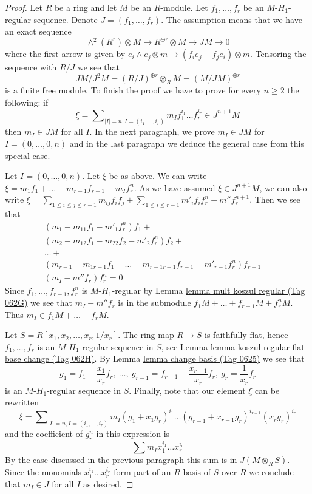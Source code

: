 \documentclass{amsart}
\theoremstyle{plain}
\theoremstyle{definition}
\theoremstyle{remark}
\numberwithin{equation}{subsection}
\begin{document}
\begin{proof}
Let $R$ be a ring and let $M$ be an $R$-module.
Let $f_1, \ldots, f_r$ be an $M$-$H_1$-regular sequence.
Denote $J = (f_1, \ldots, f_r)$. The assumption means that we have
an exact sequence
$$
\wedge^2(R^r) \otimes M \to R^{\oplus r} \otimes M \to JM \to 0
$$
where the first arrow is given by
$e_i \wedge e_j \otimes m \mapsto (f_ie_j - f_je_i) \otimes m$.
Tensoring the sequence with $R/J$ we see that
$$
JM/J^2M = (R/J)^{\oplus r} \otimes_R M = (M/JM)^{\oplus r}
$$
is a finite free module. To finish the proof we have to prove
for every $n \geq 2$ the following: if
$$
\xi = \sum\nolimits_{|I| = n, I = (i_1, \ldots, i_r)}
m_I f_1^{i_1} \ldots f_r^{i_r} \in J^{n + 1}M
$$
then $m_I \in JM$ for all $I$. In the next paragraph, we prove
$m_I \in JM$ for $I = (0, \ldots, 0, n)$ and in the last paragraph
we deduce the general case from this special case.

\medskip\noindent
Let $I = (0, \ldots, 0, n)$. Let $\xi$ be as above. We can write
$\xi = m_1 f_1 + \ldots + m_{r - 1}f_{r - 1} + m_I f_r^n$.
As we have assumed $\xi \in J^{n + 1}M$, we can also write
$\xi = \sum_{1 \leq i \leq j \leq r - 1} m_{ij}f_if_j +
\sum_{1 \leq i \leq r - 1}m'_i f_if_r^n + m'' f_r^{n + 1}$.
Then we see that
$$
\begin{matrix}
(m_1 - m_{11}f_1 - m'_1f_r^n)f_1 + \\
(m_2 - m_{12}f_1 - m_{22}f_2 - m'_2f_r^n)f_2 + \\
\ldots + \\
(m_{r - 1} - m_{1 r - 1}f_1 - \ldots - m_{r - 1 r - 1}f_{r - 1}
- m'_{r - 1}f_r^n)f_{r - 1} + \\
(m_I - m'' f_r)f_r^n = 0
\end{matrix}
$$
Since $f_1, \ldots, f_{r - 1}, f_r^n$ is $M$-$H_1$-regular by
Lemma \href{https://stacks.math.columbia.edu/tag/062G}{lemma mult koszul regular (Tag 062G)} we see that $m_I - m'' f_r$
is in the submodule $f_1M + \ldots + f_{r - 1}M + f_r^nM$.
Thus $m_I \in f_1M + \ldots + f_rM$.

\medskip\noindent
Let $S = R[x_1, x_2, \ldots, x_r, 1/x_r]$. The ring map $R \to S$ is faithfully
flat, hence $f_1, \ldots, f_r$ is an $M$-$H_1$-regular sequence in $S$, see
Lemma \href{https://stacks.math.columbia.edu/tag/062H}{lemma koszul regular flat base change (Tag 062H)}.
By
Lemma \href{https://stacks.math.columbia.edu/tag/0625}{lemma change basis (Tag 0625)}
we see that
$$
g_1 = f_1 - \frac{x_1}{x_r} f_r,
\ \ldots,
\ g_{r - 1} = f_{r - 1} - \frac{x_{r - 1}}{x_r} f_r,
\ g_r = \frac{1}{x_r}f_r
$$
is an $M$-$H_1$-regular sequence in $S$. Finally, note that our element
$\xi$ can be rewritten
$$
\xi = \sum\nolimits_{|I| = n, I = (i_1, \ldots, i_r)}
m_I (g_1 + x_1 g_r)^{i_1} \ldots (g_{r - 1} + x_{r - 1} g_r)^{i_{r - 1}}
(x_rg_r)^{i_r}
$$
and the coefficient of $g_r^n$ in this expression is
$$
\sum m_I x_1^{i_1} \ldots x_r^{i_r}
$$
By the case discussed in the previous paragraph this sum is in
$J(M \otimes_R S)$. Since the monomials $x_1^{i_1} \ldots x_r^{i_r}$
form part of an $R$-basis of $S$ over $R$ we conclude that $m_I \in J$
for all $I$ as desired.
\end{proof}
\end{document}
